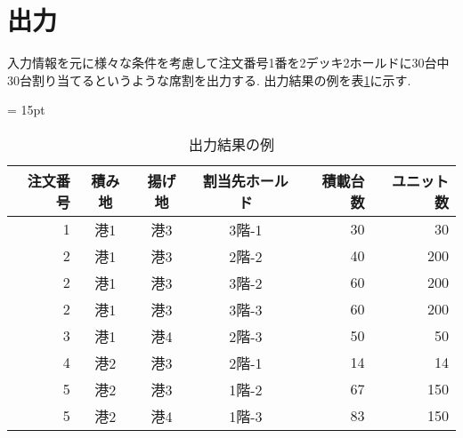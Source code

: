
\newpage

\section{出力}
入力情報を元に様々な条件を考慮して注文番号1番を2デッキ2ホールドに30台中30台割り当てるというような席割を出力する. 出力結果の例を表\ref{table23}に示す. \\

\begin{table}[htbp]
\centering
\tabcolsep = 15pt
\renewcommand{\arraystretch}{0.8}
\caption{出力結果の例}
\label{table23}
\begin{center}
\begin{tabular}{rcccrr} \hline
注文番号 & 積み地 & 揚げ地 & 割当先ホールド & 積載台数 & ユニット数 \\ \hline
1 & 港1 & 港3 & 3階-1 & 30 & 30 \\
2 & 港1 & 港3 & 2階-2 & 40 & 200 \\
2 & 港1 & 港3 & 3階-2 & 60 & 200 \\
2 & 港1 & 港3 & 3階-3 & 60 & 200 \\
3 & 港1 & 港4 & 2階-3 & 50 & 50 \\
4 & 港2 & 港3 & 2階-1 & 14 & 14 \\
5 & 港2 & 港3 & 1階-2 & 67 & 150 \\
5 & 港2 & 港4 & 1階-3 & 83 & 150 \\
\hline
\end{tabular}
\end{center}
\end{table}


